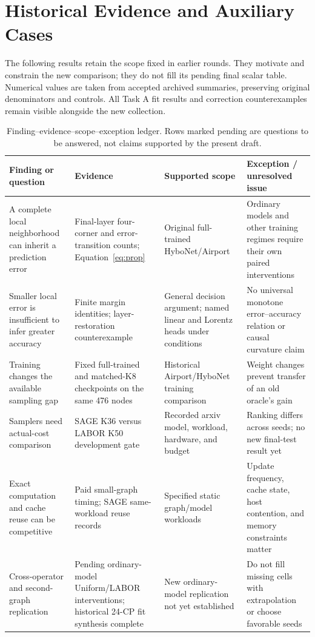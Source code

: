 \section{Historical Evidence and Auxiliary Cases}
\label{sec:historical-results}
The following results retain the scope fixed in earlier rounds. They motivate and constrain the new comparison; they do not fill its pending final scalar table. Numerical values are taken from accepted archived summaries, preserving original denominators and controls. All Task A fit results and correction counterexamples remain visible alongside the new collection.

\begin{table}[t]
\caption{Finding--evidence--scope--exception ledger. Rows marked pending are questions to be answered, not claims supported by the present draft.}
\label{tab:claims}
\begin{tabular}{p{}p{}p{}p{}}
\toprule
Finding or question & Evidence & Supported scope & Exception / unresolved issue\\
\midrule
A complete local neighborhood can inherit a prediction error & Final-layer four-corner and error-transition counts; Equation~\eqref{eq:prop} & Original full-trained HyboNet/Airport & Ordinary models and other training regimes require their own paired interventions\\
Smaller local error is insufficient to infer greater accuracy & Finite margin identities; layer-restoration counterexample & General decision argument; named linear and Lorentz heads under conditions & No universal monotone error--accuracy relation or causal curvature claim\\
Training changes the available sampling gap & Fixed full-trained and matched-K8 checkpoints on the same 476 nodes & Historical Airport/HyboNet training comparison & Weight changes prevent transfer of an old oracle's gain\\
Samplers need actual-cost comparison & SAGE K36 versus LABOR K50 development gate & Recorded arxiv model, workload, hardware, and budget & Ranking differs across seeds; no new final-test result yet\\
Exact computation and cache reuse can be competitive & Paid small-graph timing; SAGE same-workload reuse records & Specified static graph/model workloads & Update frequency, cache state, host contention, and memory constraints matter\\
Cross-operator and second-graph replication & Pending ordinary-model Uniform/LABOR interventions; historical 24-CP fit synthesis complete & New ordinary-model replication not yet established & Do not fill missing cells with extrapolation or choose favorable seeds\\
\bottomrule
\end{tabular}
\end{table}

